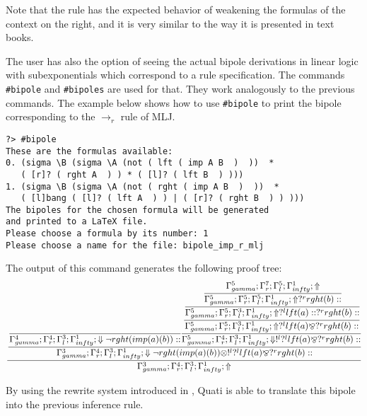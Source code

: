 \documentclass{llncs}
\begin{document}
Note that the rule has the expected behavior of weakening the formulas of the
context on the right, and it is very similar to the way it is presented in text
books.

The user has also the option of seeing the actual bipole derivations in linear
logic with subexponentials which correspond to a rule specification. The
commands \texttt{\#bipole} and \texttt{\#bipoles} are used for that. They work
analogously to the previous commands. The example below shows how to use
\texttt{\#bipole} to print the bipole corresponding to the $\rightarrow_r$ rule
of MLJ.
\vspace{-1mm}

{\small
\begin{verbatim}
?> #bipole 
These are the formulas available: 
0. (sigma \B (sigma \A (not ( lft ( imp A B  )  ))  * 
   ( [r]? ( rght A  ) ) * ( [l]? ( lft B  ) )))
1. (sigma \B (sigma \A (not ( rght ( imp A B  )  ))  * 
   ( [l]bang ( [l]? ( lft A  ) ) | ( [r]? ( rght B  ) ) )))
The bipoles for the chosen formula will be generated
and printed to a LaTeX file.
Please choose a formula by its number: 1
Please choose a name for the file: bipole_imp_r_mlj
\end{verbatim}
}

The output of this command generates the following proof tree:
%
{\scriptsize\[\cfrac{\cfrac{\cfrac{}
{\Gamma_{ gamma}^{4} ; \Gamma_{r}^{4} ; \Gamma_{l}^{3} ; \Gamma_{ infty}^{1} ;  \Downarrow \neg rght (imp (a) (b) )  :: }\cfrac{\cfrac{\cfrac{\cfrac{\Gamma_{ gamma}^{5} ; \Gamma_{r}^{7} ; \Gamma_{l}^{5} ; \Gamma_{ infty}^{1} ;  \Uparrow }
{\Gamma_{ gamma}^{5} ; \Gamma_{r}^{5} ; \Gamma_{l}^{5} ; \Gamma_{ infty}^{1} ;  \Uparrow  ?^{r} rght (b)  :: }}
{\Gamma_{ gamma}^{5} ; \Gamma_{r}^{5} ; \Gamma_{l}^{3} ; \Gamma_{ infty}^{1} ;  \Uparrow  ?^{l} lft (a)  ::  ?^{r} rght (b)  :: }}
{\Gamma_{ gamma}^{5} ; \Gamma_{r}^{5} ; \Gamma_{l}^{3} ; \Gamma_{ infty}^{1} ;  \Uparrow  ?^{l} lft (a)  \bindnasrepma  ?^{r} rght (b)  :: }}
{\Gamma_{ gamma}^{5} ; \Gamma_{r}^{4} ; \Gamma_{l}^{3} ; \Gamma_{ infty}^{1} ;  \Downarrow  !^{l}  ?^{l} lft (a)  \bindnasrepma  ?^{r} rght (b)  :: }}
{\Gamma_{ gamma}^{3} ; \Gamma_{r}^{4} ; \Gamma_{l}^{3} ; \Gamma_{ infty}^{1} ;  \Downarrow \neg rght (imp (a) (b) )  \otimes  !^{l}  ?^{l} lft (a)  \bindnasrepma  ?^{r} rght (b)  :: }}
{\Gamma_{ gamma}^{3} ; \Gamma_{r}^{4} ; \Gamma_{l}^{3} ; \Gamma_{ infty}^{1} ; \Uparrow }\]}

By using the rewrite system introduced in \cite{nigam13iclp}, Quati is able to
translate this bipole into the previous inference rule.
\end{document}
